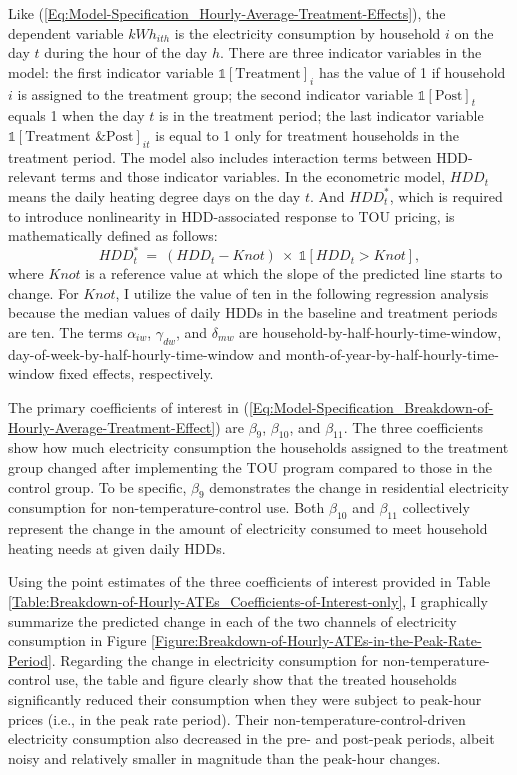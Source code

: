 Like (\ref{Eq:Model-Specification_Hourly-Average-Treatment-Effects}), the dependent variable $kWh_{ith}$ is the electricity consumption by household $i$ on the day $t$ during the hour of the day $h$. There are three indicator variables in the model: the first indicator variable $\mathbb{1}[\text{Treatment}]_{i}$ has the value of 1 if household $i$ is assigned to the treatment group; the second indicator variable $\mathbb{1}[\text{Post}]_{t}$ equals 1 when the day $t$ is in the treatment period; the last indicator variable $\mathbb{1}[\text{Treatment \& Post}]_{it}$ is equal to 1 only for treatment households in the treatment period. The model also includes interaction terms between HDD-relevant terms and those indicator variables. In the econometric model, $HDD_{t}$ means the daily heating degree days on the day $t$. And $HDD_{t}^{*}$, which is required to introduce nonlinearity in HDD-associated response to TOU pricing, is mathematically defined as follows:
\begin{equation}
HDD_{t}^{*} \ = \ (HDD_{t} - Knot) \ \times \ \mathbb{1}[HDD_{t} > Knot],
\end{equation}
where $Knot$ is a reference value at which the slope of the predicted line starts to change. For $Knot$, I utilize the value of ten in the following regression analysis because the median values of daily HDDs in the baseline and treatment periods are ten. The terms $\alpha_{iw}$, $\gamma_{dw}$, and $\delta_{mw}$ are household-by-half-hourly-time-window, day-of-week-by-half-hourly-time-window and month-of-year-by-half-hourly-time-window fixed effects, respectively. 

The primary coefficients of interest in (\ref{Eq:Model-Specification_Breakdown-of-Hourly-Average-Treatment-Effect}) are $\beta_{9}$, $\beta_{10}$, and $\beta_{11}$. The three coefficients show how much electricity consumption the households assigned to the treatment group changed after implementing the TOU program compared to those in the control group. To be specific, $\beta_{9}$ demonstrates the change in residential electricity consumption for non-temperature-control use. Both $\beta_{10}$ and $\beta_{11}$ collectively represent the change in the amount of electricity consumed to meet household heating needs at given daily HDDs. 

Using the point estimates of the three coefficients of interest provided in Table \ref{Table:Breakdown-of-Hourly-ATEs_Coefficients-of-Interest-only}, I graphically summarize the predicted change in each of the two channels of electricity consumption in Figure \ref{Figure:Breakdown-of-Hourly-ATEs-in-the-Peak-Rate-Period}. Regarding the change in electricity consumption for non-temperature-control use, the table and figure clearly show that the treated households significantly reduced their consumption when they were subject to peak-hour prices (i.e., in the peak rate period). Their non-temperature-control-driven electricity consumption also decreased in the pre- and post-peak periods, albeit noisy and relatively smaller in magnitude than the peak-hour changes. 

